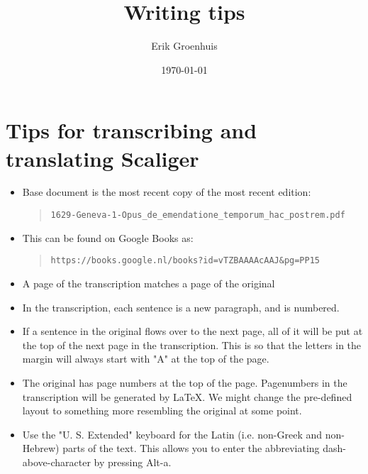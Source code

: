 \documentclass{report}
\title{Writing tips}
\author{Erik Groenhuis}
\date{\today}              %
\begin{document}
\maketitle

\tableofcontents{}




\chapter{Tips for transcribing and translating Scaliger}

\begin{itemize}
\item Base document is the most recent copy of the most recent edition:
\begin{quote}
  \verb+1629-Geneva-1-Opus_de_emendatione_temporum_hac_postrem.pdf+
\end{quote}
\item This can be found on Google Books as:
\begin{quote}
  \verb+https://books.google.nl/books?id=vTZBAAAAcAAJ&pg=PP15+
\end{quote}
\item A page of the transcription matches a page of the original
\item In the transcription, each sentence is a new paragraph, and is numbered.
\item If a sentence in the original flows over to the next page, all of it will
 be put at the top of the next page in the transcription.  This is so that the
 letters in the margin will always start with "A" at the top of the page.
\item The original has page numbers at the top of the page. Pagenumbers in the
 transcription will be generated by LaTeX. We might change the pre-defined
 layout to something more resembling the original at some point.
\item Use the "U. S. Extended" keyboard for the Latin (i.e. non-Greek and
 non-Hebrew) parts of the text. This allows you to enter the abbreviating
 dash-above-character by pressing Alt-a.
\end{itemize}
\end{document}
